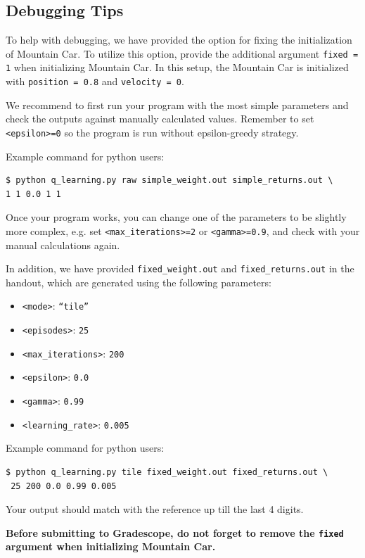 \documentclass[11pt,addpoints,answers]{exam}
\begin{document}
\subsection{Debugging Tips}

To help with debugging, we have provided the option for fixing the initialization of Mountain Car. To utilize this option, provide the additional argument \texttt{fixed = 1} when initializing Mountain Car. In this setup, the Mountain Car is initialized with \texttt{position = 0.8} and \texttt{velocity = 0}. 

We recommend to first run your program with the most simple parameters and check the outputs against manually calculated values. Remember to set \texttt{<epsilon>=0} so the program is run without epsilon-greedy strategy.

Example command for python users: 
\begin{lstlisting}[language=Shell]
$ python q_learning.py raw simple_weight.out simple_returns.out \
1 1 0.0 1 1
\end{lstlisting}
Once your program works, you can change one of the parameters to be slightly more complex, e.g. set \texttt{<max\_iterations>=2} or \texttt{<gamma>=0.9}, and check with your manual calculations again.

In addition, we have provided \texttt{fixed\_weight.out} and \texttt{fixed\_returns.out} in the handout, which are generated using the following parameters:
\begin{itemize}
    \item \texttt{<mode>}: \texttt{``tile''}
    \item \texttt{<episodes>}: \texttt{25}
    \item \texttt{<max\_iterations>}: \texttt{200}
    \item \texttt{<epsilon>}: \texttt{0.0}
    \item \texttt{<gamma>}: \texttt{0.99}
    \item \texttt{<learning\_rate>}: \texttt{0.005}
\end{itemize}

Example command for python users:
\begin{lstlisting}[language=Shell]
$ python q_learning.py tile fixed_weight.out fixed_returns.out \ 
 25 200 0.0 0.99 0.005
\end{lstlisting}

Your output should match with the reference up till the last 4 digits.

\textbf{Before submitting to Gradescope, do not forget to remove the \texttt{fixed} argument when initializing Mountain Car. }
\end{document}
